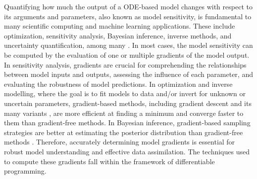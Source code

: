 Quantifying how much the output of a ODE-based model changes with respect to its arguments and parameters, also known as model sensitivity, is fundamental to many scientific computing and machine learning applications. 
These include optimization, sensitivity analysis, Bayesian inference, inverse methods, and uncertainty quantification, among many \cite{Razavi.2021}. 
In most cases, the model sensitivity can be computed by the evaluation of one or multiple gradients of the model output. 
In sensitivity analysis, gradients are crucial for comprehending the relationships between model inputs and outputs, assessing the influence of each parameter, and evaluating the robustness of model predictions. 
In optimization and inverse modelling, where the goal is to fit models to data and/or invert for unknown or uncertain parameters, gradient-based methods, including gradient descent and its many variants \cite{ruder2016overview-gradient-descent}, are more efficient at finding a minimum and converge faster to them than gradient-free methods.
In Bayesian inference, gradient-based sampling strategies are better at estimating the posterior distribution than gradient-free methods \cite{neal2011mcmc}.
Therefore, accurately determining model gradients is essential for robust model understanding and effective data assimilation. 
The techniques used to compute these gradients fall within the framework of differentiable programming.

